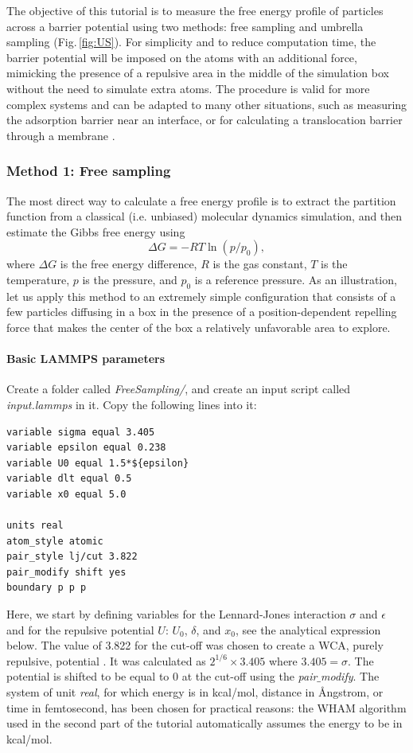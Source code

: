\documentclass[9pt,tutorial]{livecoms}
\begin{document}
\noindent The objective of this tutorial is to measure the free energy profile of particles across a barrier potential using two methods: free sampling and umbrella sampling \cite{kastner2011umbrella, allen2017computer, frenkel2023understanding} (Fig.\,\ref{fig:US}). For simplicity and to reduce computation time, the barrier potential will be imposed on the atoms with an additional force, mimicking the presence of a repulsive area in the middle of the simulation box without the need to simulate extra atoms. The procedure is valid for more complex systems and can be adapted to many other situations, such as measuring the adsorption barrier near an interface, or for calculating a translocation barrier through a membrane \cite{wilson1997adsorption, makarov2009computer, gravelle2021adsorption}.

\subsubsection{Method 1: Free sampling}
The most direct way to calculate a free energy profile is to extract the partition function from a classical (i.e. unbiased) molecular dynamics simulation, and then estimate the Gibbs free energy using
\begin{equation}
\Delta G = -RT \ln(p/p_0),
\label{eq:G}
\end{equation}
where $\Delta G$ is the free energy difference, $R$ is the gas constant, $T$ is the temperature, $p$ is the pressure, and $p_0$ is a reference pressure. As an illustration, let us apply this method to an extremely simple configuration that consists of a few particles diffusing in a box in the presence of a position-dependent repelling force that makes the center of the box a relatively unfavorable area to explore.

\paragraph{Basic LAMMPS parameters}
\noindent Create a folder called \textit{FreeSampling/}, and create an input script called \textit{input.lammps} in it. Copy the following lines into it:
{\normalsize \begin{verbatim}
variable sigma equal 3.405
variable epsilon equal 0.238
variable U0 equal 1.5*${epsilon}
variable dlt equal 0.5
variable x0 equal 5.0

units real
atom_style atomic
pair_style lj/cut 3.822
pair_modify shift yes
boundary p p p
\end{verbatim}}
Here, we start by defining variables for the Lennard-Jones interaction $\sigma$ and $\epsilon$ and for the repulsive potential $U$: $U_0$, $\delta$, and $x_0$, see the analytical expression below. The value of 3.822 for the cut-off was chosen to create a WCA, purely repulsive, potential \cite{weeks1971role}. It was calculated as $2^{1/6} \times 3.405$ where $3.405 = \sigma$. The potential is shifted to be equal to 0 at the cut-off using the \textit{pair$\_$modify}. The system of unit \textit{real}, for which energy is in kcal/mol, distance in Ångstrom, or time in femtosecond, has been chosen for practical reasons: the WHAM algorithm used in the second part of the tutorial automatically assumes the energy to be in kcal/mol.
\end{document}

